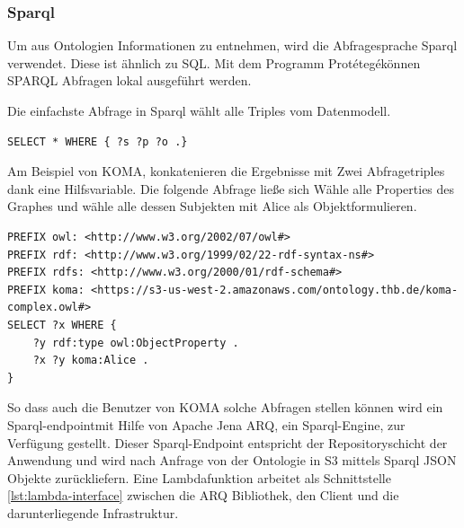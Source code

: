 \documentclass[
12pt,
english,
ngerman,
headsepline,
twoside,
openright,
numbers=noenddot,version=first
]{scrreprt}
\begin{document}
\subsubsection{Sparql}
Um aus Ontologien Informationen zu entnehmen, wird die Abfragesprache \acrfull{Sparql} 
verwendet. Diese ist ähnlich zu SQL. Mit dem Programm \glqq Protétegé\grqq können SPARQL Abfragen lokal ausgeführt werden.

Die einfachste Abfrage in Sparql wählt alle Triples vom Datenmodell.

\begin{lstlisting}[language=Sparql]
SELECT * WHERE { ?s ?p ?o .}
\end{lstlisting}

Am Beispiel von KOMA, konkatenieren die Ergebnisse mit Zwei Abfragetriples dank eine Hilfsvariable. Die folgende Abfrage ließe sich \glqq Wähle alle Properties des Graphes und wähle alle dessen Subjekten mit Alice als Objekt\grqq formulieren. \\
\begin{lstlisting}
PREFIX owl: <http://www.w3.org/2002/07/owl#>
PREFIX rdf: <http://www.w3.org/1999/02/22-rdf-syntax-ns#>
PREFIX rdfs: <http://www.w3.org/2000/01/rdf-schema#>
PREFIX koma: <https://s3-us-west-2.amazonaws.com/ontology.thb.de/koma-complex.owl#>
SELECT ?x WHERE {
	?y rdf:type owl:ObjectProperty .
	?x ?y koma:Alice .
}
\end{lstlisting}

So dass auch die Benutzer von \acrshort{KOMA} solche Abfragen stellen können wird ein \glqq Sparql-endpoint\grqq mit Hilfe von Apache Jena ARQ, ein Sparql-Engine, zur Verfügung gestellt. 
Dieser Sparql-Endpoint entspricht der Repositoryschicht der Anwendung und wird nach Anfrage von der Ontologie in S3 mittels Sparql JSON Objekte zurückliefern.
Eine Lambdafunktion arbeitet als Schnittstelle \ref{lst:lambda-interface} zwischen die ARQ Bibliothek, den Client und die darunterliegende Infrastruktur.


\end{document}
